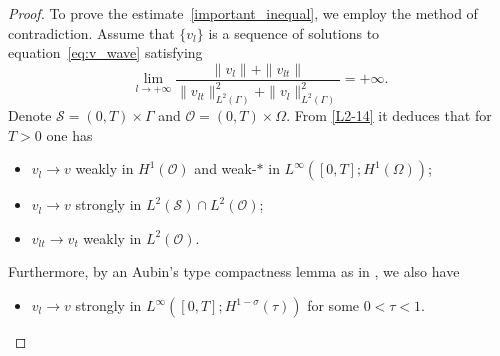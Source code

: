 \documentclass{elsarticle}
\begin{document}
\begin{proof}
To prove the estimate~\eqref{important_inequal}, we employ the method of contradiction. Assume that $\{v_{l}\}$ is a sequence of solutions to equation~\eqref{eq:v_wave} satisfying
	\begin{equation}\label{L2-15}
		\lim_{l\rightarrow +\infty}\frac{\| v_l\|+\| v_{lt}\|}{\|v_{lt}\|^{2}_{L^2(\Gamma)}+\|v_{l}\|^{2}_{L^2(\Gamma)}}=+\infty.
	\end{equation}
Denote $\mathcal{S} = (0, T) \times \Gamma$ and $\mathcal{O} = (0, T)\times \Omega$. From \eqref{L2-14} it deduces that for $T>0$ one has
\begin{itemize} 
\item[-] $v_l \rightarrow v$ weakly in $H^{1}(\mathcal{O})$ and weak-$\ast$ in $L^{\infty}([0, T]; H^{1}(\Omega))$; 
\item[-] $v_l \rightarrow v$ strongly in $L^{2}(\mathcal{S})\cap L^{2}(\mathcal{O})$; 
\item[-] $v_{lt} \rightarrow v_t$ weakly in $L^{2}(\mathcal{O})$.
\end{itemize}
Furthermore, by an Aubin's type compactness lemma as in \cite[Page 65]{simon1986compact}, we also have
	\begin{itemize}
		\item[-] $v_l \rightarrow v$ strongly in $L^{\infty}([0, T]; H^{1-\sigma}(\tau))$ for some $0 < \tau <1 $.
	\end{itemize}


\end{proof}
\end{document}
